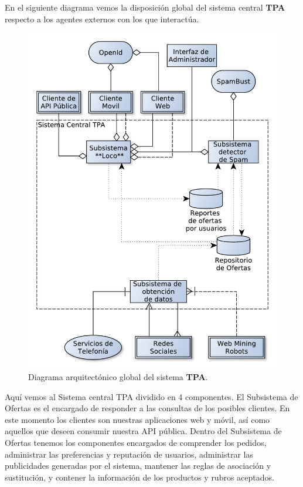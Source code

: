 En el siguiente diagrama vemos la disposición global del sistema central \textbf{TPA} respecto a los agentes externos con los que interactúa. 

\begin{figure}[H]
	\centering
	\includegraphics[width=\textwidth]{graficos/arch/global_overview.pdf}
	\caption{Diagrama arquitectónico global del sistema \textbf{TPA}.}
\end{figure}

Aquí vemos al \textsf{Sistema central TPA} dividido en 4 componentes. El \textsf{Subsistema de Ofertas} es el encargado de responder a las consultas de los posibles clientes. En este momento los clientes son nuestras aplicaciones web y móvil, así como aquellos que deseen consumir nuestra API pública. Dentro del \textsf{Subsistema de Ofertas} tenemos los componentes encargados de comprender los pedidos, administrar las preferencias y reputación de usuarios, administrar las publicidades generadas por el sistema, mantener las reglas de asociación y sustitución, y contener la información de los productos y rubros aceptados.

